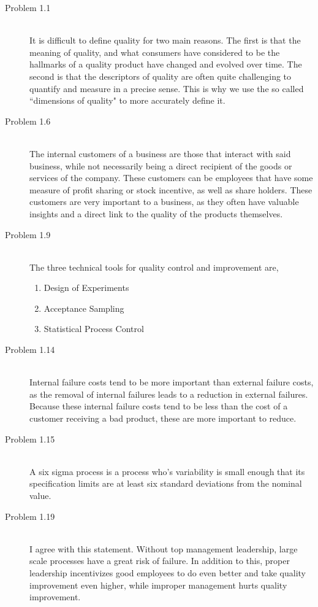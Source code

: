 \documentclass[letterpaper,10pt]{article}
\begin{document}
\begin{description}
\item[Problem 1.1]\hfill \\
It is difficult to define quality for two main reasons. The first is that the meaning of quality, and what consumers have considered to be the hallmarks of a quality product have changed and evolved over time. The second is that the descriptors of quality are often quite challenging to quantify and measure in a precise sense. This is why we use the so called ``dimensions of quality" to more accurately define it.
\item[Problem 1.6]\hfill \\
The internal customers of a business are those that interact with said business, while not necessarily being a direct recipient of the goods or services of the company. These customers can be employees that have some measure of profit sharing or stock incentive, as well as share holders. These customers are very important to a business, as they often have valuable insights and a direct link to the quality of the products themselves.
\item[Problem 1.9]\hfill \\
The three technical tools for quality control and improvement are,
\begin{enumerate}
\item Design of Experiments
\item Acceptance Sampling
\item Statistical Process Control
\end{enumerate}
\item[Problem 1.14]\hfill \\
Internal failure costs tend to be more important than external failure costs, as the removal of internal failures leads to a reduction in external failures. Because these internal failure costs tend to be less than the cost of a customer receiving a bad product, these are more important to reduce.
\item[Problem 1.15]\hfill \\
A six sigma process is a process who's variability is small enough that its specification limits are at least six standard deviations from the nominal value.
\item[Problem 1.19]\hfill \\
I agree with this statement. Without top management leadership, large scale processes have a great risk of failure. In addition to this, proper leadership incentivizes good employees to do even better and take quality improvement even higher, while improper management hurts quality improvement.

\end{description}
\end{document}
